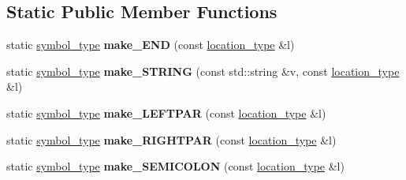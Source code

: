 \subsection*{Static Public Member Functions}
\begin{DoxyCompactItemize}
\item 
static \hyperlink{classEzAquarii_1_1Parser_a219e44a6cf61b8a88cf0db8d5bb7be5d}{symbol\+\_\+type} {\bfseries make\+\_\+\+E\+ND} (const \hyperlink{classEzAquarii_1_1Parser_acc4b937a827f1be285bf28ec90eeb125}{location\+\_\+type} \&l)\hypertarget{classEzAquarii_1_1Parser_a64bc5f8c6607233518d0f0c505de93a9}{}\label{classEzAquarii_1_1Parser_a64bc5f8c6607233518d0f0c505de93a9}

\item 
static \hyperlink{classEzAquarii_1_1Parser_a219e44a6cf61b8a88cf0db8d5bb7be5d}{symbol\+\_\+type} {\bfseries make\+\_\+\+S\+T\+R\+I\+NG} (const std\+::string \&v, const \hyperlink{classEzAquarii_1_1Parser_acc4b937a827f1be285bf28ec90eeb125}{location\+\_\+type} \&l)\hypertarget{classEzAquarii_1_1Parser_abf9dafd4ffc35984e31e3c84488593ef}{}\label{classEzAquarii_1_1Parser_abf9dafd4ffc35984e31e3c84488593ef}

\item 
static \hyperlink{classEzAquarii_1_1Parser_a219e44a6cf61b8a88cf0db8d5bb7be5d}{symbol\+\_\+type} {\bfseries make\+\_\+\+L\+E\+F\+T\+P\+AR} (const \hyperlink{classEzAquarii_1_1Parser_acc4b937a827f1be285bf28ec90eeb125}{location\+\_\+type} \&l)\hypertarget{classEzAquarii_1_1Parser_a4324d2938dce6e36206e186a3aa13ba6}{}\label{classEzAquarii_1_1Parser_a4324d2938dce6e36206e186a3aa13ba6}

\item 
static \hyperlink{classEzAquarii_1_1Parser_a219e44a6cf61b8a88cf0db8d5bb7be5d}{symbol\+\_\+type} {\bfseries make\+\_\+\+R\+I\+G\+H\+T\+P\+AR} (const \hyperlink{classEzAquarii_1_1Parser_acc4b937a827f1be285bf28ec90eeb125}{location\+\_\+type} \&l)\hypertarget{classEzAquarii_1_1Parser_a0df3a1547d1fe4d6b10e45502de43b6f}{}\label{classEzAquarii_1_1Parser_a0df3a1547d1fe4d6b10e45502de43b6f}

\item 
static \hyperlink{classEzAquarii_1_1Parser_a219e44a6cf61b8a88cf0db8d5bb7be5d}{symbol\+\_\+type} {\bfseries make\+\_\+\+S\+E\+M\+I\+C\+O\+L\+ON} (const \hyperlink{classEzAquarii_1_1Parser_acc4b937a827f1be285bf28ec90eeb125}{location\+\_\+type} \&l)\hypertarget{classEzAquarii_1_1Parser_afe57a94b971524b68419da3db527cb8e}{}\label{classEzAquarii_1_1Parser_afe57a94b971524b68419da3db527cb8e}


\end{DoxyCompactItemize}
